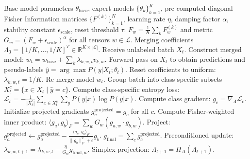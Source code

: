 \documentclass{article}
\theoremstyle{plain}
\theoremstyle{definition}
\theoremstyle{remark}
\begin{document}
\begin{algorithm}[tb]
\caption{Information-Geometric Gradient Surgery (IGGS-Merge)}
\label{alg:iggs_merge}
\begin{algorithmic}[1]\footnotesize
{} Base model parameters $\theta_{\text{base}}$, expert models $\{\theta_k\}_{k=1}^K$, pre-computed diagonal Fisher Information matrices $\{F^{(k)}\}_{k=1}^K$, learning rate $\eta$, damping factor $\alpha$, stability constant $\epsilon_{\text{scale}}$, reset threshold $\tau$.
 $F_w = \frac{1}{K} \sum_k F^{(k)}_w$ and metric $G_w = (F_w + \epsilon_{\text{scale}})^\alpha$ for all tensors $w \in \mathcal{L}$.
 Merging coefficients $\Lambda_0 = [1/K, \dots, 1/K]^T \in \mathbb{R}^{K \times |\mathcal{L}|}$.
    \STATE Receive unlabeled batch $X_t$.
    \STATE Construct merged model: $w_t = w_{\text{base}} + \sum_k \lambda_{k, w, t} v_{k, w}$.
    \STATE Forward pass on $X_t$ to obtain predictions and pseudo-labels $\hat{y} = \arg\max P(y|X_t; \theta_t)$.
        \STATE Reset coefficients to uniform: $\lambda_{k, w, t} = 1/K$.
        \STATE Re-merge model $w_t$.
    \ENDIF
    \STATE Group batch into class-specific subsets $X_t^c = \{x \in X_t \mid \hat{y} = c\}$.
        \STATE Compute class-specific entropy loss: $\mathcal{L}_c = -\frac{1}{|X_t^c|} \sum_{x \in X_t^c} \sum_y P(y|x) \log P(y|x)$.
        \STATE Compute class gradient: $g_c = \nabla_{\Lambda} \mathcal{L}_c$.
    \ENDFOR
    \STATE Initialize projected gradients $g_c^{\text{projected}} = g_c$ for all $c$.
        \STATE Compute Fisher-weighted inner product: $\langle g_a, g_b \rangle_F = \sum_{w} G_w (g_{a,w} \cdot g_{b,w})$.
            \STATE Project: $g_a^{\text{projected}} \leftarrow g_a^{\text{projected}} - \frac{\langle g_a, g_b \rangle_F}{\|g_b\|_F^2 + \epsilon} g_b$.
        \ENDIF
    \ENDFOR
    \STATE $g_{\text{final}} = \sum_c g_c^{\text{projected}}$.
    \STATE Preconditioned update: $\lambda_{k, w, t+1} = \lambda_{k, w, t} - \frac{\eta}{G_w} g_{\text{final}, w}$.
    \STATE Simplex projection: $\Lambda_{t+1} = \Pi_{\Delta}(\Lambda_{t+1})$.
\ENDFOR
\end{algorithmic}
\end{algorithm}
\end{document}
